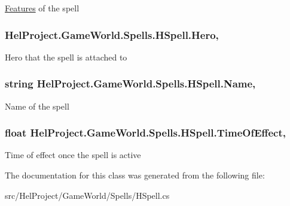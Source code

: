\hyperlink{namespace_hel_project_1_1_features}{Features} of the spell 

\hypertarget{class_hel_project_1_1_game_world_1_1_spells_1_1_h_spell_a1867f356bf0a68b755703db7e556cbbd}{}
\subsubsection[{Hero}]{ Hel\+Project.\+Game\+World.\+Spells.\+H\+Spell.\+Hero\hspace{0.3cm}{\ttfamily [get]}, {\ttfamily [set]}}\label{class_hel_project_1_1_game_world_1_1_spells_1_1_h_spell_a1867f356bf0a68b755703db7e556cbbd}


Hero that the spell is attached to 

\hypertarget{class_hel_project_1_1_game_world_1_1_spells_1_1_h_spell_a66d41a1b498d10e9d77229bdb39fd783}{}
\subsubsection[{Name}]{\setlength{\rightskip}{0pt plus 5cm}string Hel\+Project.\+Game\+World.\+Spells.\+H\+Spell.\+Name\hspace{0.3cm}{\ttfamily [get]}, {\ttfamily [set]}}\label{class_hel_project_1_1_game_world_1_1_spells_1_1_h_spell_a66d41a1b498d10e9d77229bdb39fd783}


Name of the spell 

\hypertarget{class_hel_project_1_1_game_world_1_1_spells_1_1_h_spell_ae6cb50ade7feb332679ed6b45079d1ce}{}
\subsubsection[{Time\+Of\+Effect}]{\setlength{\rightskip}{0pt plus 5cm}float Hel\+Project.\+Game\+World.\+Spells.\+H\+Spell.\+Time\+Of\+Effect\hspace{0.3cm}{\ttfamily [get]}, {\ttfamily [set]}}\label{class_hel_project_1_1_game_world_1_1_spells_1_1_h_spell_ae6cb50ade7feb332679ed6b45079d1ce}


Time of effect once the spell is active 



The documentation for this class was generated from the following file\+:\begin{DoxyCompactItemize}
\item 
src/\+Hel\+Project/\+Game\+World/\+Spells/H\+Spell.\+cs\end{DoxyCompactItemize}
